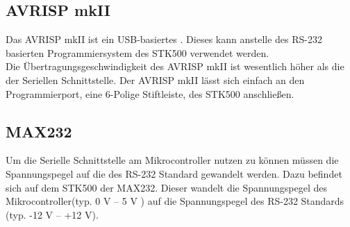 \subsection{AVRISP mkII}
\label{sec:AVRISP}
Das AVRISP mkII ist ein USB-basiertes . Dieses kann anstelle des RS-232 basierten Programmiersystem des STK500 verwendet werden.\\
Die Übertragungsgeschwindigkeit des AVRISP mkII ist wesentlich höher als die der Seriellen Schnittstelle. 
Der AVRISP mkII lässt sich einfach an den Programmierport, eine 6-Polige Stiftleiste, des STK500 anschließen.

\subsection{MAX232}
\label{sec:MAX232}
Um die Serielle Schnittstelle am Mikrocontroller nutzen zu können müssen die Spannungspegel auf die des RS-232 Standard gewandelt werden. Dazu befindet sich auf dem STK500 der  MAX232. 
Dieser wandelt die Spannungspegel des Mikrocontroller(typ. 0 V -- 5 V ) auf die Spannungspegel des RS-232 Standards (typ. -12 V -- +12 V).
